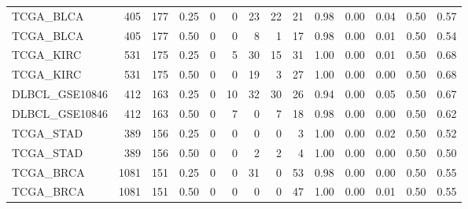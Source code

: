 \begin{table}[!htbp]
{\begin{tabular}{lrrr rrrrr rrr rr}
TCGA\_BLCA & 405 & 177 & 0.25 & 0 & 0 & 23 & 22 & 21 & 0.98 & 0.00 & 0.04 & 0.50 & 0.57 \\
TCGA\_BLCA & 405 & 177 & 0.50 & 0 & 0 & 8 & 1 & 17 & 0.98 & 0.00 & 0.01 & 0.50 & 0.54 \\
TCGA\_KIRC & 531 & 175 & 0.25 & 0 & 5 & 30 & 15 & 31 & 1.00 & 0.00 & 0.01 & 0.50 & 0.68 \\
TCGA\_KIRC & 531 & 175 & 0.50 & 0 & 0 & 19 & 3 & 27 & 1.00 & 0.00 & 0.00 & 0.50 & 0.68 \\
DLBCL\_GSE10846 & 412 & 163 & 0.25 & 0 & 10 & 32 & 30 & 26 & 0.94 & 0.00 & 0.05 & 0.50 & 0.67 \\
DLBCL\_GSE10846 & 412 & 163 & 0.50 & 0 & 7 & 0 & 7 & 18 & 0.98 & 0.00 & 0.00 & 0.50 & 0.62 \\
TCGA\_STAD & 389 & 156 & 0.25 & 0 & 0 & 0 & 0 & 3 & 1.00 & 0.00 & 0.02 & 0.50 & 0.52 \\
TCGA\_STAD & 389 & 156 & 0.50 & 0 & 0 & 2 & 2 & 4 & 1.00 & 0.00 & 0.00 & 0.50 & 0.50 \\
TCGA\_BRCA & 1081 & 151 & 0.25 & 0 & 0 & 31 & 0 & 53 & 0.98 & 0.00 & 0.00 & 0.50 & 0.55 \\
TCGA\_BRCA & 1081 & 151 & 0.50 & 0 & 0 & 0 & 0 & 47 & 1.00 & 0.00 & 0.01 & 0.50 & 0.55 \\
\bottomrule
\end{tabular}}
\end{table}
